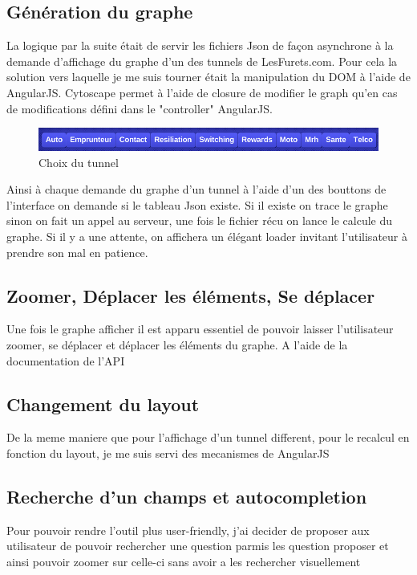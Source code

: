 \subsection{Génération du graphe}
La logique par la suite était de servir les fichiers Json de façon asynchrone à la demande d'affichage du graphe d'un des tunnels de LesFurets.com. Pour cela la solution vers laquelle je me suis tourner était la manipulation du DOM à l'aide de AngularJS. Cytoscape permet à l'aide de closure de modifier le graph qu'en cas de modifications défini dans le "controller" AngularJS. 
\vspace{0.2in}
\begin{figure}[!ht]
\center
\includegraphics[width=15cm]{outil/buttons-tunnels.png}
\caption{Choix du tunnel}
\end{figure}
Ainsi à chaque demande du graphe d'un tunnel à l'aide d'un des bouttons de l'interface on demande si le tableau Json existe. Si il existe on trace le graphe sinon on fait un appel au serveur, une fois le fichier récu on lance le calcule du graphe. Si il y a une attente, on affichera un élégant loader invitant l'utilisateur à prendre son mal en patience.

\subsection{Zoomer, Déplacer les éléments, Se déplacer}
Une fois le graphe afficher il est apparu essentiel de pouvoir laisser l’utilisateur zoomer, se déplacer et déplacer les éléments du graphe. A l'aide de la documentation de l'API

\subsection{Changement du layout}
De la meme maniere que pour l’affichage d’un tunnel different, pour le recalcul en fonction du layout, je me suis servi des mecanismes de AngularJS

\subsection{Recherche d’un champs et autocompletion}
Pour pouvoir rendre l’outil plus user-friendly, j’ai decider de proposer aux utilisateur de pouvoir rechercher une question parmis les question proposer et ainsi pouvoir zoomer sur celle-ci sans avoir a les rechercher visuellement

